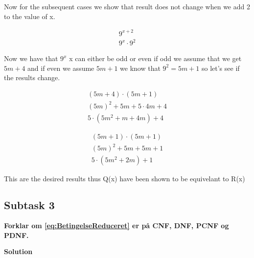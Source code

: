 Now for the subsequent cases we show that result does not change when we add 2 to the value of x.

\begin{equation}
    \begin{aligned}
        9^{x+2} \\
        9^x \cdot 9^2
    \end{aligned}
\end{equation} 

Now we have that $9^x$ x can either be odd or even if odd we assume that we get $5m+4$ and if even we assume $5m+1$ we know that $9^2=5m+1$ so let's see if the results change.

\begin{equation}
    \begin{aligned}
        (5m + 4) \cdot (5m + 1) \\ 
        (5m)^2 + 5m + 5 \cdot 4m + 4 \\
        5 \cdot (5m^2 + m + 4m) + 4
    \end{aligned}
\end{equation} 

\begin{equation}
    \begin{aligned}
        (5m + 1) \cdot (5m + 1) \\ 
        (5m)^2 + 5m + 5m + 1 \\
        5 \cdot (5m^2 + 2m) + 1
    \end{aligned}
\end{equation} 

This are the desired results thus Q(x) have been shown to be equivelant to R(x)

\subsection{Subtask 3}
\noindent
\textbf{Forklar om \eqref{eq:BetingelseReduceret} er på CNF, DNF, PCNF og PDNF.}

\bigskip
\noindent
\textbf{Solution}
